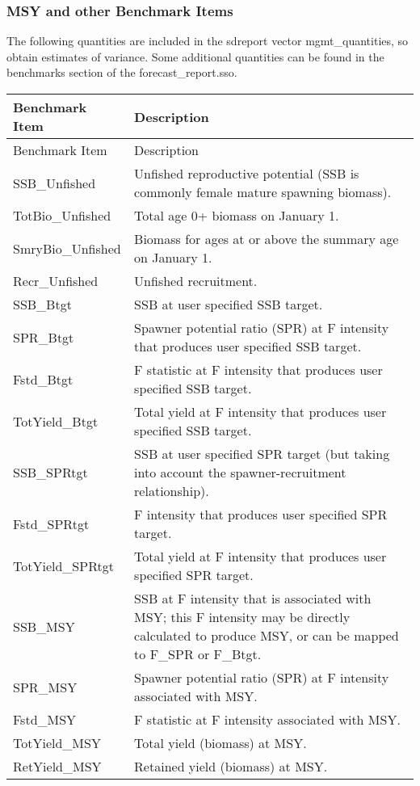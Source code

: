\subsubsection{MSY and other Benchmark Items}
The following quantities are included in the sdreport vector mgmt\_quantities, so obtain estimates of variance.  Some additional quantities can be found in the benchmarks section of the forecast\_report.sso.

\begin{center}
	\begin{longtable}{p{4cm} p{11cm}}
		\hline
		Benchmark Item &  Description\Tstrut\Bstrut\\
		\hline
		\endfirsthead

		\hline
		Benchmark Item &  Description\Tstrut\Bstrut\\
		\hline
		\endhead
		
		\endfoot
		\hline		
		\endlastfoot
		
		SSB\_Unfished \Tstrut& Unfished reproductive potential (SSB is commonly female mature spawning biomass).\\
		TotBio\_Unfished \Tstrut& Total age 0+ biomass on January 1.\\
		SmryBio\_Unfished \Tstrut& Biomass for ages at or above the summary age on January 1.\\
		Recr\_Unfished \Tstrut& Unfished recruitment.\\
		SSB\_Btgt \Tstrut& SSB at user specified SSB target.\\
		SPR\_Btgt \Tstrut& Spawner potential ratio (SPR) at F intensity that produces user specified SSB target.\\
		Fstd\_Btgt \Tstrut& F statistic at F intensity that produces user specified SSB target.\\
		TotYield\_Btgt \Tstrut& Total yield at F intensity that produces user specified SSB target.\\
		SSB\_SPRtgt \Tstrut& SSB at user specified SPR target (but taking into account the spawner-recruitment relationship).\\
		Fstd\_SPRtgt \Tstrut& F intensity that produces user specified SPR target.\\
		TotYield\_SPRtgt \Tstrut& Total yield at F intensity that produces user specified SPR target.\\
		SSB\_MSY \Tstrut& SSB at F intensity that is associated with MSY; this F intensity may be directly calculated to produce MSY, or can be mapped to F\_SPR or F\_Btgt.\\
		SPR\_MSY \Tstrut& Spawner potential ratio (SPR) at F intensity associated with MSY.\\
		Fstd\_MSY \Tstrut& F statistic at F intensity associated with MSY.\\
		TotYield\_MSY \Tstrut& Total yield (biomass) at MSY.\\
		RetYield\_MSY \Tstrut& Retained yield (biomass) at MSY.\Bstrut\\ 
	\end{longtable}
\end{center}


